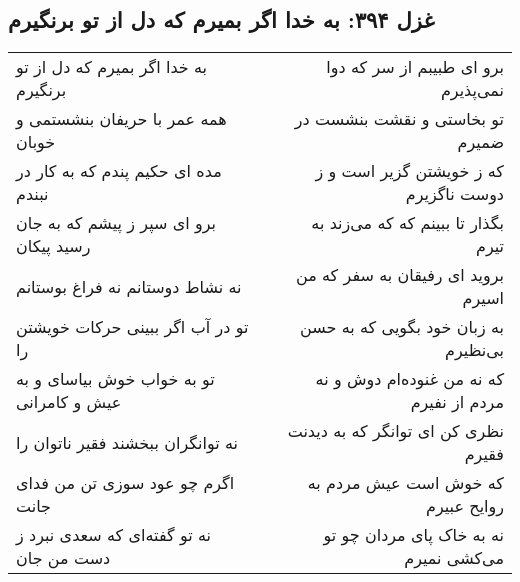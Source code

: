 \begin{center}
\section*{غزل ۳۹۴: به خدا اگر بمیرم که دل از تو برنگیرم}
\label{sec:394}
\begin{longtable}{l p{0.5cm} r}
به خدا اگر بمیرم که دل از تو برنگیرم
&&
برو ای طبیبم از سر که دوا نمی‌پذیرم
\\
همه عمر با حریفان بنشستمی و خوبان
&&
تو بخاستی و نقشت بنشست در ضمیرم
\\
مده ای حکیم پندم که به کار در نبندم
&&
که ز خویشتن گزیر است و ز دوست ناگزیرم
\\
برو ای سپر ز پیشم که به جان رسید پیکان
&&
بگذار تا ببینم که که می‌زند به تیرم
\\
نه نشاط دوستانم نه فراغ بوستانم
&&
بروید ای رفیقان به سفر که من اسیرم
\\
تو در آب اگر ببینی حرکات خویشتن را
&&
به زبان خود بگویی که به حسن بی‌نظیرم
\\
تو به خواب خوش بیاسای و به عیش و کامرانی
&&
که نه من غنوده‌ام دوش و نه مردم از نفیرم
\\
نه توانگران ببخشند فقیر ناتوان را
&&
نظری کن ای توانگر که به دیدنت فقیرم
\\
اگرم چو عود سوزی تن من فدای جانت
&&
که خوش است عیش مردم به روایح عبیرم
\\
نه تو گفته‌ای که سعدی نبرد ز دست من جان
&&
نه به خاک پای مردان چو تو می‌کشی نمیرم
\\
\end{longtable}
\end{center}
